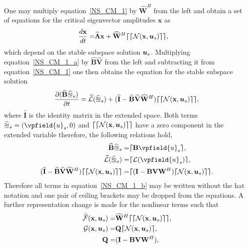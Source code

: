 One may multiply equation~\eqref{NS_CM_1} by $\mathbf{\widehat{W}}^{H}$ from the left and obtain a set of equations for the critical eigenvector amplitudes $\mathbf{x}$ as
\begin{eqnarray}
	\label{NS_CM_1_a}
	\frac{d \mathbf{x}}{d t} =&
	\mathbf{\widehat{\Lambda}x}  +	\mathbf{\widehat{W}}^{H}\boldsymbol{\lceil}\boldsymbol{\lceil}\mathcal{N}(\mathbf{x},\boldsymbol{u}_{s}) \boldsymbol{\rceil}\boldsymbol{\rceil},
\end{eqnarray}
which depend on the stable subspace solution $\boldsymbol{u}_{s}$. Multiplying equation~\eqref{NS_CM_1_a} by $\mathbf{\widehat{B}}\mathbf{\widehat{V}}$ from the left and subtracting it from equation~\eqref{NS_CM_1} one then obtains the equation for the stable subspace solution
\begin{equation}
	\label{NS_CM_1_b}
	\frac{\partial (\mathbf{\widehat{B}}\mathbb{\widehat{u}}_{s})}{\partial t} =
	\mathcal{\widehat{L}}(\mathbb{\widehat{u}}_{s}) + (\mathbf{\widehat{I}} - \mathbf{\widehat{B}}\mathbf{\widehat{V}}\mathbf{\widehat{W}}^{H})\boldsymbol{\lceil}\boldsymbol{\lceil}\mathcal{N}(\mathbf{x},\boldsymbol{u}_{s}) \boldsymbol{\rceil}\boldsymbol{\rceil},
\end{equation}
where $\mathbf{\widehat{I}}$ is the identity matrix in the extended space. Both terms $\efield{u}_{s} = (\vpfield{u}_{s},0)$ and $\boldsymbol{\lceil}\boldsymbol{\lceil}\mathcal{N}(\mathbf{x},\boldsymbol{u}_{s}) \boldsymbol{\rceil}\boldsymbol{\rceil}$ have a zero component in the extended variable therefore, the following relations hold, 
\begin{equation}
	\label{Hat_Ts_to_Ts}
	\begin{aligned}
		\mathbf{\widehat{B}}\efield{u}_{s} =& \blbracket \mathbf{B}\vpfield{u}_{s}\brbracket, \\
		\mathcal{\widehat{L}}(\efield{u}_{s}) =& \blbracket\mathcal{L}(\vpfield{u}_{s})\brbracket, \\
		(\mathbf{\widehat{I}} -\mathbf{\widehat{B}}\mathbf{\widehat{V}}\mathbf{\widehat{W}}^{H})\blbracket\blbracket\mathcal{N}(\mathbf{x},\vfield{u}_{s}) \brbracket\brbracket =& \blbracket(\mathbf{I} - \mathbf{B}\mathbf{V}\mathbf{W}^{H})\blbracket\mathcal{N}(\mathbf{x},\vfield{u}_{s}) \brbracket \brbracket.
	\end{aligned} \nonumber
\end{equation}
Therefore all terms in equation~\eqref{NS_CM_1_b} may be written without the hat notation and one pair of ceiling brackets may be dropped from the equations. A further representation change is made for the nonlinear terms such that
\begin{equation}
	\begin{aligned}
		\mathcal{\widehat{F}}(\mathbf{x},\boldsymbol{u}_{s}) =& \mathbf{\widehat{W}}^{H}\boldsymbol{\lceil}\boldsymbol{\lceil}\mathcal{N}(\mathbf{x},\boldsymbol{u}_{s})\boldsymbol{\rceil}\boldsymbol{\rceil},  \\
		\mathcal{G}(\mathbf{x},\boldsymbol{u}_{s}) =&
		\mathbf{Q}\boldsymbol{\lceil}\mathcal{N}(\mathbf{x},\boldsymbol{u}_{s}) \boldsymbol{\rceil}, \\
		\mathbf{Q} =&
		(\mathbf{I} - \mathbf{B}\mathbf{V}\mathbf{W}^{H}),
	\end{aligned} \nonumber
\end{equation}
